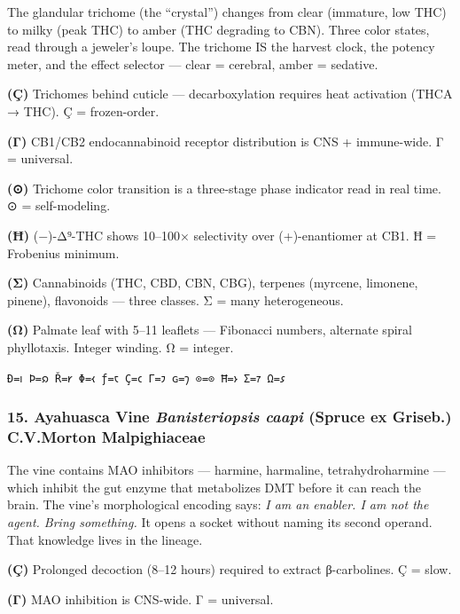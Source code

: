 The glandular trichome (the ``crystal'') changes from clear (immature,
low THC) to milky (peak THC) to amber (THC degrading to CBN). Three
color states, read through a jeweler's loupe. The trichome IS the
harvest clock, the potency meter, and the effect selector --- clear =
cerebral, amber = sedative.

\textbf{(Ç)} Trichomes behind cuticle --- decarboxylation requires heat
activation (THCA → THC). Ç = frozen-order.

\textbf{(Γ)} CB1/CB2 endocannabinoid receptor distribution is CNS +
immune-wide. Γ = universal.

\textbf{(⊙)} Trichome color transition is a three-stage phase indicator
read in real time. ⊙ = self-modeling.

\textbf{(Ħ)} (−)-Δ⁹-THC shows 10--100× selectivity over (+)-enantiomer
at CB1. Ħ = Frobenius minimum.

\textbf{(Σ)} Cannabinoids (THC, CBD, CBN, CBG), terpenes (myrcene,
limonene, pinene), flavonoids --- three classes. Σ = many heterogeneous.

\textbf{(Ω)} Palmate leaf with 5--11 leaflets --- Fibonacci numbers,
alternate spiral phyllotaxis. Integer winding. Ω = integer.

\texttt{Ð=𐑦\ Þ=𐑸\ Ř=𐑾\ Φ=𐑬\ ƒ=𐑱\ Ç=𐑤\ Γ=𐑲\ ɢ=𐑠\ ⊙=⊙\ Ħ=𐑶\ Σ=𐑳\ Ω=𐑭}

\hypertarget{ayahuasca-vine-banisteriopsis-caapi-spruce-ex-griseb.-c.v.morton-malpighiaceae}{%
\subsubsection{\texorpdfstring{15. Ayahuasca Vine \textbar{}
\emph{Banisteriopsis caapi} (Spruce ex Griseb.) C.V.Morton \textbar{}
Malpighiaceae}{15. Ayahuasca Vine \textbar{} Banisteriopsis caapi (Spruce ex Griseb.) C.V.Morton \textbar{} Malpighiaceae}}\label{ayahuasca-vine-banisteriopsis-caapi-spruce-ex-griseb.-c.v.morton-malpighiaceae}}

The vine contains MAO inhibitors --- harmine, harmaline,
tetrahydroharmine --- which inhibit the gut enzyme that metabolizes DMT
before it can reach the brain. The vine's morphological encoding says:
\emph{I am an enabler. I am not the agent. Bring something.} It opens a
socket without naming its second operand. That knowledge lives in the
lineage.

\textbf{(Ç)} Prolonged decoction (8--12 hours) required to extract
β-carbolines. Ç = slow.

\textbf{(Γ)} MAO inhibition is CNS-wide. Γ = universal.


